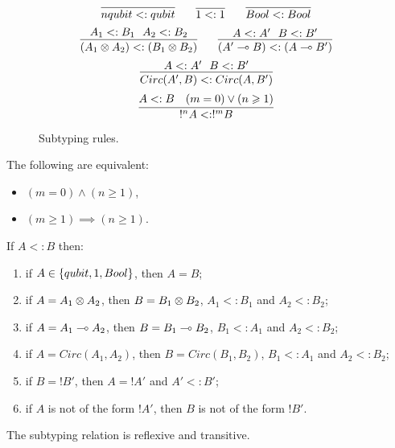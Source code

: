 \documentclass{article}
\begin{document}
\begin{figure}[!ht]
\begin{mdframed}
\[
  \infer[]{nqubit <: qubit}{}
~~~~
  \infer[]{1 <: 1}{}
~~~~
  \infer[]{Bool <: Bool}{}
\]
\[
  \infer[]{ (A_1\tensor A_2) <:  (B_1 \tensor B_2)}{A_1<:B_1~~A_2<:B_2}
~~~~
  \infer[]{ (A'\loli B) <: (A\loli B')}{A<:A'~~B<:B'}
\]
\[
  \infer[]{ Circ(A', B) <:  Circ(A, B')}{A<:A'~~B<:B'}
\]
\[
  \infer[]{ !^nA <: !^mB}{
    A<:B
    &
    (m=0)\vee (n\geq 1)
  }
\]
%
\end{mdframed}
\caption{Subtyping rules.}
\label{subtyping_congruences}
\end{figure}


\begin{remark}
\label{equiv_subtype_arithm}
The following are equivalent:
\begin{itemize}
  \item $(m=0)\wedge (n\geq 1)$,
  \item $(m\geq 1) \implies (n\geq 1)$.
\end{itemize}
\end{remark}

\begin{remark}
\label{subtyping_shape}
If $A<:B$ then:
\begin{enumerate}
  \item if $A\in\{qubit, 1, Bool\}$, then $A=B$;
  \item if $A=A_1\otimes A_2$, then $B=B_1\otimes B_2$, 
  $A_1<:B_1$ and $A_2<:B_2$;
  \item if $A=A_1\multimap A_2$, then $B=B_1\multimap B_2$, 
  $B_1<:A_1$ and $A_2<:B_2$;
  \item if $A=Circ(A_1, A_2)$, then $B=Circ(B_1,B_2)$, 
  $B_1<:A_1$ and $A_2<:B_2$;
  \item if $B=!B'$, then $A=!A'$ and $A'<:B'$; \label{subtype_bang}
  \item if $A$ is not of the form $!A'$, then $B$ is not 
  of the form $!B'$.
\end{enumerate}
\end{remark}

\begin{proposition}
The subtyping relation is reflexive and transitive.
\end{proposition}
\end{document}

